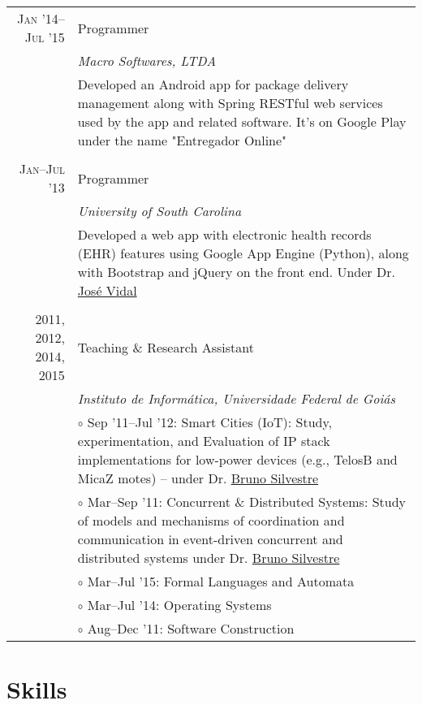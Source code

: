 \documentclass[a4paper,10pt]{article}
\begin{document}
\begin{longtable}{r|p{11cm}}
  \textsc{Jan '14--Jul '15} & Programmer \\ &\emph{Macro Softwares,
  LTDA}\\ &\footnotesize{Developed an Android app for package delivery
  management along with Spring RESTful web services used by the app
  and related software. It's on Google Play under the name "Entregador
  Online"}\\ \multicolumn{2}{c}{} \\

  \textsc{Jan--Jul '13} & Programmer \\ &\emph{University of South Carolina}\\
  &\footnotesize{Developed a web app with electronic health
  records (EHR) features using Google App Engine
  (Python), along with Bootstrap and jQuery on the front end.
  Under Dr. \href{http://jmvidal.cse.sc.edu}{José Vidal}}\\

  \multicolumn{2}{c}{} \\

  \textsc{2011, 2012, 2014, 2015} & Teaching \& Research Assistant \\ &\emph{Instituto
  de Informática, Universidade Federal de Goiás} \\
  &\footnotesize{$\circ$ Sep '11--Jul '12: Smart Cities (IoT): Study, experimentation,
  and Evaluation of IP stack implementations for low-power devices (e.g., TelosB
  and MicaZ motes) -- under Dr. \href{http://inf.ufg.br/~brunoos/}{Bruno Silvestre}} \\
  &\footnotesize{$\circ$ Mar--Sep '11: Concurrent \& Distributed Systems: Study of
  models and mechanisms of coordination and communication in
  event-driven concurrent and distributed systems under Dr.
  \href{http://inf.ufg.br/~brunoos/}{Bruno Silvestre}} \\
  &\footnotesize{$\circ$ Mar--Jul '15: Formal Languages and Automata} \\
  &\footnotesize{$\circ$ Mar--Jul '14: Operating Systems} \\
  &\footnotesize{$\circ$ Aug--Dec '11: Software Construction} \\

\end{longtable}

\section{Skills}
\end{document}
